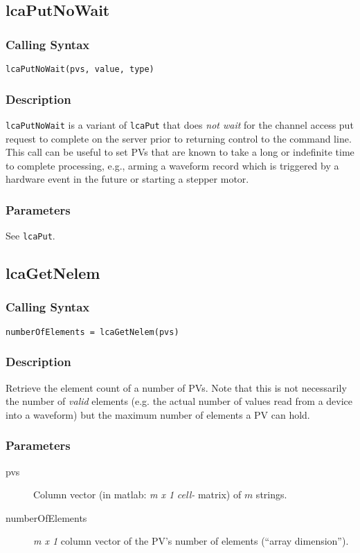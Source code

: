 \documentclass{article}
\newcommand{\com}[1]{{\tt #1}}
\newcommand{\pbrk}{\pagebreak[3]}
\newcommand{\pbrkf}{\pagebreak}
\newcommand{\ita}[1]{\emph{#1}}
\newcommand{\m}{$m$}
\newcommand{\mhack}{$m$} %
\newcommand{\mxl}{$m\times 1$}
\renewcommand{\m}{\ita{m}}
\newcommand{\mhack}{\ita{m}} %
\renewcommand{\mxl}{\ita{m x 1}}
\renewcommand{\pbrk}{}
\renewcommand{\pbrkf}{}
\newcommand{\PVITEM}{
\item[pvs] Column vector (in matlab: \mxl{} \ita{cell-} matrix)
of \mhack{} strings.
}
\begin{document}
\vspace*{\fill}
\pbrkf
\subsection{lcaPutNoWait}
\label{lcaputnowait}
\subsubsection{Calling Syntax}
\begin{verbatim}
lcaPutNoWait(pvs, value, type)
\end{verbatim}
\subsubsection{Description}
\com{lcaPutNoWait} is a variant of \com{lcaPut} that does {\em not wait}
for the channel access put request to complete on the server prior to
returning control to the command line.
This call can be useful to set PVs that are known to take a long
or indefinite time to complete processing, e.g., arming a waveform record
which is triggered by a hardware event in the future or starting a stepper
motor.

\subsubsection{Parameters}
See \com{lcaPut}.

\vspace*{\fill}
\pbrk
\subsection{lcaGetNelem}
\subsubsection{Calling Syntax}
\begin{verbatim}
numberOfElements = lcaGetNelem(pvs)
\end{verbatim}
\subsubsection{Description}
Retrieve the element count of a number of PVs. Note that this is not
necessarily the number of \ita{valid} elements (e.g. the actual number
of values read from a device into a waveform) but the maximum number
of elements a PV can hold.
\subsubsection{Parameters}
\begin{description}
\PVITEM
\item[numberOfElements] \mxl{} column vector of the PV's number
of elements (``array dimension'').
\end{description}
\end{document}
